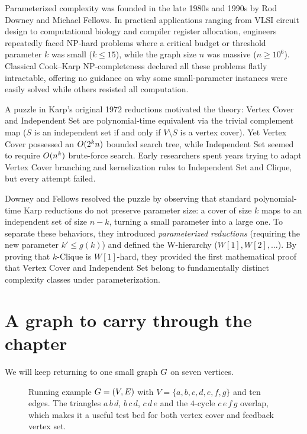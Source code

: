 \begin{historybox}
Parameterized complexity was founded in the late 1980s and 1990s by Rod Downey and
Michael Fellows. In practical applications ranging from VLSI circuit design to computational
biology and compiler register allocation, engineers repeatedly faced NP-hard problems where
a critical budget or threshold parameter $k$ was small ($k \le 15$), while the graph size $n$
was massive ($n \ge 10^6$). Classical Cook--Karp NP-completeness declared all these problems
flatly intractable, offering no guidance on why some small-parameter instances were easily
solved while others resisted all computation.

A puzzle in Karp's original 1972 reductions motivated the theory: Vertex Cover
and Independent Set are polynomial-time equivalent via the trivial complement map ($S$ is an
independent set if and only if $V \setminus S$ is a vertex cover). Yet Vertex Cover possessed
an $O(2^k n)$ bounded search tree, while Independent Set seemed to require $O(n^k)$
brute-force search. Early researchers spent years trying to adapt Vertex Cover branching
and kernelization rules to Independent Set and Clique, but every attempt failed.

Downey and Fellows resolved the puzzle by observing that standard polynomial-time Karp reductions
do not preserve parameter size: a cover of size $k$ maps to an independent set of size $n - k$,
turning a small parameter into a large one. To separate these behaviors, they introduced
\emph{parameterized reductions} (requiring the new parameter $k' \le g(k)$) and defined the
W-hierarchy ($W[1], W[2], \dots$). By proving that $k$-Clique is $W[1]$-hard, they provided the
first mathematical proof that Vertex Cover and Independent Set belong to fundamentally
distinct complexity classes under parameterization.
\end{historybox}

\section{A graph to carry through the chapter}

We will keep returning to one small graph $G$ on seven vertices.

\begin{figure}[H]
\centering
{}
\caption{Running example $G=(V,E)$ with $V=\{a,b,c,d,e,f,g\}$ and ten edges. The triangles $a\,b\,d$, $b\,c\,d$, $c\,d\,e$ and the $4$-cycle $c\,e\,f\,g$ overlap, which makes it a useful test bed for both vertex cover and feedback vertex set.}
\label{ch25:fig-running}
\end{figure}


